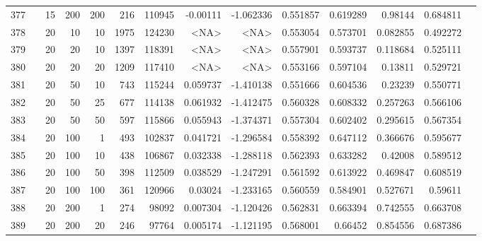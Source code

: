 \begin{longtable}{llrrrrrrrrrrrr}
		377 & &           15 &               200 &          200 &         216 &     110945 &  -0.00111 & -1.062336 &  0.551857 &    0.619289 &        0.98144 &  0.684811 \\
		378 & &           20 &                10 &           10 &           1975 &     124230 &      <NA> &      <NA> &  0.553054 &    0.573701 &       0.082855 &  0.492272 \\
		379 & &           20 &                20 &           10 &           1397 &     118391 &      <NA> &      <NA> &  0.557901 &    0.593737 &       0.118684 &  0.525111 \\
		380 & &           20 &                20 &           20 &           1209 &     117410 &      <NA> &      <NA> &  0.553166 &    0.597104 &        0.13811 &  0.529721 \\
		381 & &           20 &                50 &           10 &         743 &     115244 &  0.059737 & -1.410138 &  0.551666 &    0.604536 &        0.23239 &  0.550771 \\
		382 & &           20 &                50 &           25 &         677 &     114138 &  0.061932 & -1.412475 &  0.560328 &    0.608332 &       0.257263 &  0.566106 \\
		383 & &           20 &                50 &           50 &         597 &     115866 &  0.055943 & -1.374371 &  0.557304 &    0.602402 &       0.295615 &  0.567354 \\
		384 & &           20 &               100 &            1 &         493 &     102837 &  0.041721 & -1.296584 &  0.558392 &    0.647112 &       0.366676 &  0.595677 \\
		385 & &           20 &               100 &           10 &         438 &     106867 &  0.032338 & -1.288118 &  0.562393 &    0.633282 &        0.42008 &  0.589512 \\
		386 & &           20 &               100 &           50 &         398 &     112509 &  0.038529 & -1.247291 &  0.561592 &    0.613922 &       0.469847 &  0.608519 \\
		387 & &           20 &               100 &          100 &         361 &     120966 &   0.03024 & -1.233165 &  0.560559 &    0.584901 &       0.527671 &   0.59611 \\
		388 & &           20 &               200 &            1 &         274 &      98092 &  0.007304 & -1.120426 &  0.562831 &    0.663394 &       0.742555 &  0.663708 \\
		389 & &           20 &               200 &           20 &         246 &      97764 &  0.005174 & -1.121195 &  0.568001 &     0.66452 &       0.854556 &  0.687386 \\

\end{longtable}
